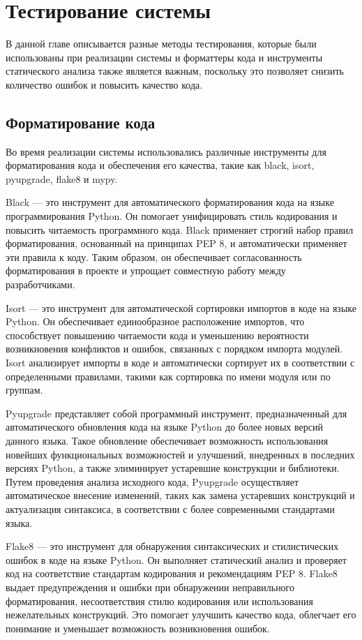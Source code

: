 \documentclass[PI, VKR]{HSEUniversity}
\begin{document}
\chapter{Тестирование системы}
\label{sec:orga7114c7}
В данной главе описывается разные методы тестирования, которые были использованы при реализации системы и форматтеры кода и инструменты статического анализа также является важным, поскольку это позволяет снизить количество ошибок и повысить качество кода.
\section{Форматирование кода}
\label{sec:orgae9c3ff}
Во время реализации системы использовались различные инструменты для форматирования кода и обеспечения его качества, такие как black, isort, pyupgrade, flake8 и mypy.

Black — это инструмент для автоматического форматирования кода на языке программирования Python. Он помогает унифицировать стиль кодирования и повысить читаемость программного кода. Black применяет строгий набор правил форматирования, основанный на принципах PEP 8, и автоматически применяет эти правила к коду. Таким образом, он обеспечивает согласованность форматирования в проекте и упрощает совместную работу между разработчиками.

Isort — это инструмент для автоматической сортировки импортов в коде на языке Python. Он обеспечивает единообразное расположение импортов, что способствует повышению читаемости кода и уменьшению вероятности возникновения конфликтов и ошибок, связанных с порядком импорта модулей. Isort анализирует импорты в коде и автоматически сортирует их в соответствии с определенными правилами, такими как сортировка по имени модуля или по группам.

Pyupgrade представляет собой программный инструмент, предназначенный для автоматического обновления кода на языке Python до более новых версий данного языка. Такое обновление обеспечивает возможность использования новейших функциональных возможностей и улучшений, внедренных в последних версиях Python, а также элиминирует устаревшие конструкции и библиотеки. Путем проведения анализа исходного кода, Pyupgrade осуществляет автоматическое внесение изменений, таких как замена устаревших конструкций и актуализация синтаксиса, в соответствии с более современными стандартами языка.

Flake8 — это инструмент для обнаружения синтаксических и стилистических ошибок в коде на языке Python. Он выполняет статический анализ и проверяет код на соответствие стандартам кодирования и рекомендациям PEP 8. Flake8 выдает предупреждения и ошибки при обнаружении неправильного форматирования, несоответствия стилю кодирования или использования нежелательных конструкций. Это помогает улучшить качество кода, облегчает его понимание и уменьшает возможность возникновения ошибок.
\end{document}
